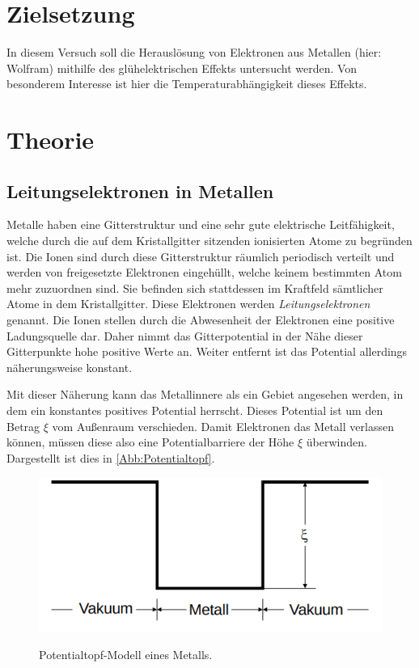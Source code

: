 \section{Zielsetzung}
\label{sec:Zielsetzung}

In diesem Versuch soll die Herauslösung von Elektronen aus Metallen (hier: Wolfram)
mithilfe des glühelektrischen Effekts untersucht werden. Von besonderem Interesse
ist hier die Temperaturabhängigkeit dieses Effekts.

\section{Theorie}
\label{sec:Theorie}

\subsection{Leitungselektronen in Metallen}

Metalle haben eine Gitterstruktur und eine sehr gute 
elektrische Leitfähigkeit, welche durch die auf dem 
Kristallgitter sitzenden ionisierten Atome zu begründen
ist.
Die Ionen sind durch diese Gitterstruktur räumlich
periodisch verteilt und werden von freigesetzte Elektronen
eingehüllt, welche keinem bestimmten Atom mehr zuzuordnen
sind. Sie befinden sich stattdessen im Kraftfeld sämtlicher
Atome in dem Kristallgitter.
Diese Elektronen werden \textit{Leitungselektronen} genannt.
Die Ionen stellen durch die Abwesenheit der Elektronen
eine positive Ladungsquelle dar. Daher nimmt das Gitterpotential
in der Nähe dieser Gitterpunkte hohe positive Werte an.
Weiter entfernt ist das Potential allerdings näherungsweise
konstant.

Mit dieser Näherung kann das Metallinnere als ein Gebiet
angesehen werden, in dem ein konstantes positives Potential
herrscht. Dieses Potential ist um den Betrag $\xi$
vom Außenraum verschieden. Damit Elektronen das Metall
verlassen können, müssen diese also eine Potentialbarriere
der Höhe $\xi$ überwinden. Dargestellt ist dies 
in \autoref{Abb:Potentialtopf}.\\

\begin{figure}[H]
    \centering
    
    \caption{Potentialtopf-Modell eines Metalls.\cite{sample}}
    \includegraphics[width=\textwidth]{Bilder/Potentialtopf.png}
    \label{Abb:Potentialtopf}
\end{figure}

